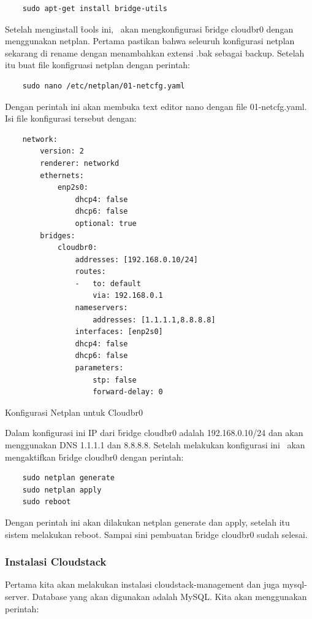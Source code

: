 \begin{lstlisting}
    sudo apt-get install bridge-utils
\end{lstlisting}

Setelah menginstall \f{tools} ini, \saya\ akan mengkonfigurasi \f{bridge} cloudbr0 dengan menggunakan netplan. Pertama pastikan bahwa seleuruh konfigurasi netplan sekarang di rename dengan menambahkan extensi .bak sebagai backup. Setelah itu buat file konfigruasi netplan dengan perintah:

\begin{lstlisting}
    sudo nano /etc/netplan/01-netcfg.yaml
\end{lstlisting}

Dengan perintah ini akan membuka text editor nano dengan file 01-netcfg.yaml. Isi file konfigurasi tersebut dengan:

\begin{listing}[H]
    \begin{verbatim}
    network:
        version: 2
        renderer: networkd
        ethernets:
            enp2s0:
                dhcp4: false
                dhcp6: false
                optional: true
        bridges:
            cloudbr0:
                addresses: [192.168.0.10/24]
                routes:
                -   to: default
                    via: 192.168.0.1
                nameservers:
                    addresses: [1.1.1.1,8.8.8.8]
                interfaces: [enp2s0]
                dhcp4: false
                dhcp6: false
                parameters:
                    stp: false
                    forward-delay: 0
    \end{verbatim}
    \caption{Konfigurasi Netplan untuk Cloudbr0}
    \label{code:netplan_config}
\end{listing}

Dalam konfigurasi ini IP dari \f{bridge} cloudbr0 adalah 192.168.0.10/24 dan akan menggunakan DNS 1.1.1.1 dan 8.8.8.8. Setelah melakukan konfigurasi ini \saya\ akan mengaktifkan \f{bridge} cloudbr0 dengan perintah:

\begin{lstlisting}
    sudo netplan generate
    sudo netplan apply
    sudo reboot
\end{lstlisting}

Dengan perintah ini akan dilakukan netplan generate dan apply, setelah itu sistem melakukan reboot. Sampai sini pembuatan \f{bridge} cloudbr0 sudah selesai.

\subsubsection{Instalasi Cloudstack}
Pertama kita akan melakukan instalasi cloudstack-management dan juga mysql-server. Database yang akan digunakan adalah MySQL. Kita akan menggunakan perintah:

